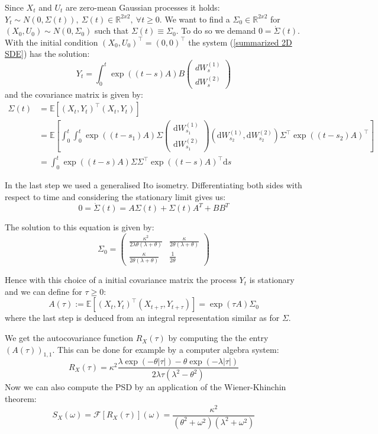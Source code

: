 \documentclass[%
thesis=student,%
coverpage=false,%
titlepage=false,%
headmarks=true, %
english,%
font=libertine, %
math=newpxtx, %
BCOR=5mm,%
coverBCOR=11mm%
]{tumbook}
\begin{document}
Since $X_{t}$ and $U_{t}$ are zero-mean Gaussian processes it holds: $Y_{t} \sim N(0,\Sigma(t)),\ \Sigma(t) \in \mathbb{R}^{2x2}, \ \forall t\geq 0$. We want to find a $\Sigma_{0} \in \mathbb{R}^{2x2}$ for $(X_{0},U_{0}) \sim N(0,\Sigma_{0})$ such that $\Sigma(t) \equiv \Sigma_{0}$. To do so we demand $0 = \dot{\Sigma}(t)$. With the initial condition $(X_{0},U_{0})^\top = (0,0)^\top$ the system (\ref{summarized 2D SDE}) has the solution: 
\[
Y_{t} = \int_{0}^{t}\exp((t-s)A)B\begin{pmatrix} dW_{s}^{(1)} \\ dW_{s}^{(2)} \end{pmatrix}
\]
and the covariance matrix is given by:
\begin{align*}
\Sigma(t)&=\mathbb{E}[\left(X_t,Y_t\right)^\top\left(X_t,Y_t\right)]\\
 &=\mathbb{E}[\int_0^t\int_0^t\exp((t-s_1)A)\Sigma\begin{pmatrix}\mathrm{d} W_{s_1}^{(1)}\\\mathrm{d} W_{s_1}^{(2)}\end{pmatrix}\left(\mathrm{d} W_{s_2}^{(1)},\mathrm{d} W_{s_2}^{(2)}\right)\Sigma^\top\exp((t-s_2)A)^\top]\\
 &=\int_0^t\exp((t-s)A)\Sigma\Sigma^\top\exp((t-s)A)^\top \mathrm{d} s
\end{align*}

In the last step we used a generalised Ito isometry. Differentiating both sides with respect to time and considering the stationary limit gives us:
\[
0 = \dot{\Sigma}(t) = A\Sigma(t) + \Sigma(t) A^{T} + BB^{T} 
\]

The solution to this equation is given by: 
\[
\Sigma_{0} = 
\begin{pmatrix}
    \frac{\kappa^{2}}{2\lambda\theta(\lambda + \theta)} & \frac{\kappa}{2\theta(\lambda + \theta)} \\
    \frac{\kappa}{2\theta(\lambda + \theta)} & \frac{1}{2\theta}
\end{pmatrix}
\]

Hence with this choice of a initial covariance matrix the process $Y_{t}$ is stationary and we can define for $\tau \geq 0$:
\[
A(\tau):=\mathbb{E}[(X_{t},Y_{t})^\top(X_{t+\tau},Y_{t+\tau})] = \exp(\tau A)\Sigma_{0}
\]
where the last step is deduced from an integral representation similar as for $\Sigma$.

We get the autocovariance function $R_{X}(\tau)$ by computing the the entry $(A(\tau))_{1,1}$. This can be done for example by a computer algebra system: 
\[
R_{X}(\tau) = \kappa^{2}\frac{\lambda\exp(-\theta\lvert\tau\rvert)-\theta\exp(-\lambda\lvert\tau\rvert)}{2\lambda\tau(\lambda^{2}-\theta^{2})} 
\]
Now we can also compute the PSD by an application of the Wiener-Khinchin theorem:
\[
S_{X}(\omega) = \mathcal{F}[R_{X}(\tau)](\omega) = \frac{\kappa^{2}}{(\theta^{2} + \omega^{2})(\lambda^{2} + \omega^{2})}
\]
\end{document}
